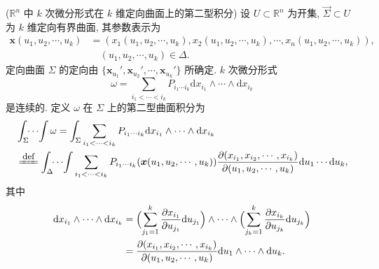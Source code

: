 \begin{definition}\label{def:11.3.6}
($\mathbb{R}^{n}$ 中 $k$ 次微分形式在 $k$ 维定向曲面上的第二型积分) 设 $U\subset\mathbb{R}^{n}$ 为开集, $\vec{\Sigma}\subset U$ 为 $k$ 维定向有界曲面, 其参数表示为
\[
\begin{aligned}
\boldsymbol{x}(u_{1},u_{2},\cdots,u_{k})&=(x_{1}(u_{1},u_{2},\cdots,u_{k}),x_{2}(u_{1},u_{2},\cdots,u_{k}),\cdots,x_{n}(u_{1},u_{2},\cdots,u_{k})),\\
&\quad(u_{1},u_{2},\cdots,u_{k})\in\Delta.
\end{aligned}
\]
定向曲面 $\Sigma$ 的定向由 $\{\boldsymbol{x}_{u_{1}}',\boldsymbol{x}_{u_{2}}',\cdots,\boldsymbol{x}_{u_{k}}'\}$ 所确定. $k$ 次微分形式
\[
\omega=\sum_{i_{1}<\cdots<i_{k}}P_{i_{1}\cdots i_{k}}\mathrm{d}x_{i_{1}}\wedge\cdots\wedge\mathrm{d}x_{i_{k}}
\]
是连续的. 定义 $\omega$ 在 $\Sigma$ 上的第二型曲面积分为
\[
\begin{aligned}
&\int_{\Sigma}\!\!\cdots\!\int\omega=\int_{\Sigma}\sum_{i_{1}<\cdots<i_{k}}P_{i_{1}\cdots i_{k}}\mathrm{d}x_{i_{1}}\wedge\cdots\wedge\mathrm{d}x_{i_{k}}\\
&\reason{def}\int_{\Delta}\!\!\cdots\!\int\sum_{i_{1}<\cdots<i_{k}}P_{i_{1}\cdots i_{k}}(\boldsymbol{x}(u_{1},u_{2},\cdots,u_{k}))\frac{\partial(x_{i_{1}},x_{i_{2}},\cdots,x_{i_{k}})}{\partial(u_{1},u_{2},\cdots,u_{k})}\mathrm{d}u_{1}\cdots\mathrm{d}u_{k},
\end{aligned}
\]
其中
\[
\begin{aligned}
\mathrm{d}x_{i_{1}}\wedge\cdots\wedge\mathrm{d}x_{i_{k}}&=\Bigl(\sum_{j_{1}=1}^{k}\frac{\partial x_{i_{1}}}{\partial u_{j_{1}}}\mathrm{d}u_{j_{1}}\Bigr)\wedge\cdots\wedge\Bigl(\sum_{j_{k}=1}^{k}\frac{\partial x_{i_{k}}}{\partial u_{j_{k}}}\mathrm{d}u_{j_{k}}\Bigr)\\
&=\frac{\partial(x_{i_{1}},x_{i_{2}},\cdots,x_{i_{k}})}{\partial(u_{1},u_{2},\cdots,u_{k})}\mathrm{d}u_{1}\wedge\cdots\wedge\mathrm{d}u_{k}.
\end{aligned}
\]
\end{definition}

